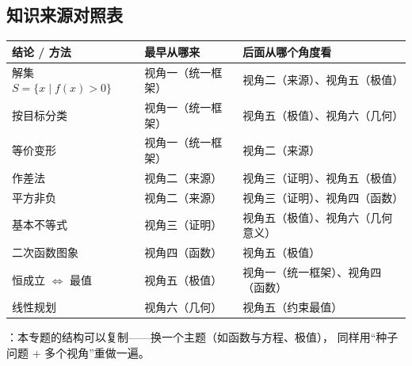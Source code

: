 \begin{afterclass}
\subsection{知识来源对照表}
\begin{center}
\footnotesize
\setlength{\tabcolsep}{4pt}
\renewcommand{\arraystretch}{1.35}
\begin{tabular}{p{3.4cm}p{4.0cm}p{5.6cm}}
\toprule
结论 / 方法 & 最早从哪来 & 后面从哪个角度看 \\
\midrule
解集 $S=\{x\mid f(x)>0\}$ & 视角一（统一框架） & 视角二（来源）、视角五（极值） \\
按目标分类 & 视角一（统一框架） & 视角五（极值）、视角六（几何） \\
等价变形 & 视角一（统一框架） & 视角二（来源） \\
作差法 & 视角二（来源） & 视角三（证明）、视角五（极值） \\
平方非负 & 视角二（来源） & 视角三（证明）、视角四（函数） \\
基本不等式 & 视角三（证明） & 视角五（极值）、视角六（几何意义） \\
二次函数图象 & 视角四（函数） & 视角五（极值） \\
恒成立 $\iff$ 最值 & 视角五（极值） & 视角一（统一框架）、视角四（函数） \\
线性规划 & 视角六（几何） & 视角五（约束最值） \\
\bottomrule
\end{tabular}
\end{center}

：本专题的结构可以复制——换一个主题（如函数与方程、极值），
同样用“种子问题 + 多个视角”重做一遍。
\end{afterclass}

